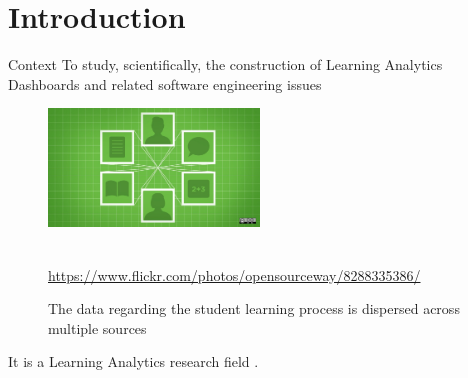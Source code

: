 \section{Introduction}

\begin{frame}{Context}
    To study, scientifically, the construction of Learning Analytics Dashboards and related software engineering issues

    \begin{figure}[H]
        \centering
        \includegraphics[width=0.5\textwidth]{../../images/digital_learning.jpg}
        \caption{The data regarding the student learning process is dispersed across multiple sources} %
        \\ \small \url{https://www.flickr.com/photos/opensourceway/8288335386/}
    \end{figure}

    It is a Learning Analytics research field \cite{lang2017handbook}.
\end{frame}

